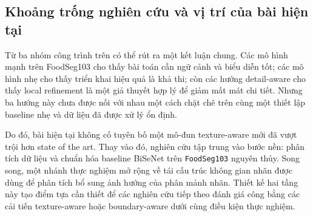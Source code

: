 \subsection{Khoảng trống nghiên cứu và vị trí của bài hiện tại}

Từ ba nhóm công trình trên có thể rút ra một kết luận chung. Các mô hình mạnh trên FoodSeg103 cho thấy bài toán cần ngữ cảnh và biểu diễn tốt; các mô hình nhẹ cho thấy triển khai hiệu quả là khả thi; còn các hướng detail-aware cho thấy local refinement là một giả thuyết hợp lý để giảm mất mát chi tiết. Nhưng ba hướng này chưa được nối với nhau một cách chặt chẽ trên cùng một thiết lập baseline nhẹ và dữ liệu đã được xử lý ổn định.

Do đó, bài hiện tại không cố tuyên bố một mô-đun texture-aware mới đã vượt trội hơn state of the art. Thay vào đó, nghiên cứu tập trung vào bước nền: phân tích dữ liệu và chuẩn hóa baseline BiSeNet trên \texttt{FoodSeg103} nguyên thủy. Song song, một nhánh thực nghiệm mở rộng về tái cấu trúc không gian nhãn được dùng để phân tích bổ sung ảnh hưởng của phân mảnh nhãn. Thiết kế hai tầng này tạo điểm tựa cần thiết để các nghiên cứu tiếp theo đánh giá công bằng các cải tiến texture-aware hoặc boundary-aware dưới cùng điều kiện thực nghiệm.
